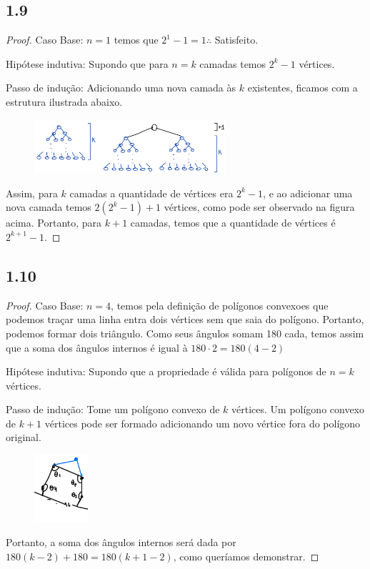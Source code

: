 \documentclass{article}
\begin{document}
\subsection*{1.9}
\begin{proof}
Caso Base: $n = 1$ temos que $2^1 - 1 = 1 \therefore$ Satisfeito.

Hipótese indutiva: Supondo que para $n = k$ camadas temos $2^k -1$ vértices.

Passo de indução: Adicionando uma nova camada às $k$ existentes, ficamos com a estrutura ilustrada abaixo.
  \begin{figure}[!h]
  \centering
  \includegraphics[height=2cm]{Q1_9.png}
  \end{figure}


Assim, para $k$ camadas a quantidade de vértices era $2^k -1$, e ao adicionar uma nova camada temos
$2(2^k - 1)+1$ vértices, como pode ser observado na figura acima. Portanto, para $k+1$ camadas, temos
que a quantidade de vértices é $2^{k+1} - 1$.

\end{proof}

\subsection*{1.10}
\begin{proof}
Caso Base: $n =4$, temos pela definição de polígonos convexoes que podemos traçar uma linha entra dois
vértices sem que saia do polígono. Portanto, podemos formar dois triângulo. Como seus ângulos somam 180
cada, temos assim que a soma dos ângulos internos é igual à $180\cdot 2 = 180(4-2)$

Hipótese indutiva: Supondo que a propriedade é válida para polígonos de $n=k$ vértices.

Passo de indução: Tome um polígono convexo de $k$ vértices. Um polígono convexo de $k+1$ vértices pode ser
formado adicionando um novo vértice fora do polígono original.
  \begin{figure}[!h]
  \centering
  \includegraphics[height=2.5cm]{Q1_10.png}
  \end{figure}

Portanto, a soma dos ângulos internos será dada por $180(k-2)+180 = 180(k+1 -2)$, como queríamos demonstrar.
\end{proof}
\end{document}
